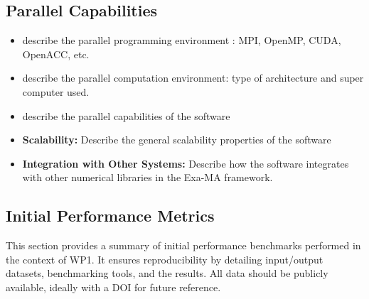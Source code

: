 \subsection{Parallel Capabilities}
\label{sec:WP1:Hawen:performances}


\begin{itemize}
    \item describe the parallel programming  environment : MPI, OpenMP, CUDA, OpenACC, etc.
    \item describe the parallel computation environment: type of architecture and super computer used.
    \item describe the parallel capabilities of the software
    \item \textbf{Scalability:} Describe the general scalability properties of the software
    \item \textbf{Integration with Other Systems:} Describe how the software integrates with other numerical libraries in the Exa-MA framework.
\end{itemize}


\subsection{Initial Performance Metrics}
\label{sec:WP1:Hawen:metrics}

This section provides a summary of initial performance benchmarks performed in the context of WP1. It ensures reproducibility by detailing input/output datasets, benchmarking tools, and the results. All data should be publicly available, ideally with a DOI for future reference.

